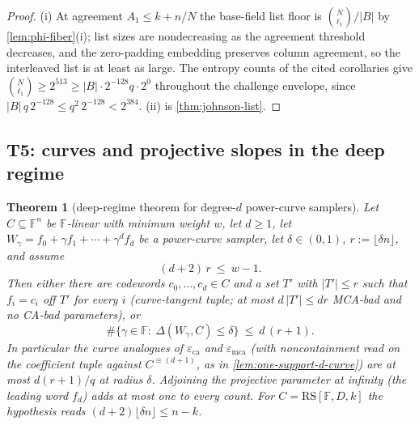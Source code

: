 \documentclass[11pt]{article}
\newtheorem{theorem}{Theorem}[section]
\theoremstyle{definition}
\theoremstyle{remark}
\newcommand{\F}{\mathbb{F}}
\newcommand{\B}{B}
\newcommand{\RS}{\mathrm{RS}}
\newcommand{\eca}{\varepsilon_{\mathrm{ca}}}
\newcommand{\emca}{\varepsilon_{\mathrm{mca}}}
\newcommand{\dist}{\Delta}
\begin{document}
\begin{proof}
(i) At agreement $A_1\le k+n/N$ the base-field list floor is $\binom N{\ell_1}/|\B|$ by \cref{lem:phi-fiber}\textup{(i)}; list sizes are nondecreasing as the agreement threshold decreases, and the zero-padding embedding preserves column agreement, so the interleaved list is at least as large. The entropy counts of the cited corollaries give $\binom N{\ell_1}\ge2^{513}\ge|\B|\cdot2^{-128}q\cdot2^{0}$ throughout the challenge envelope, since $|\B|\,q\,2^{-128}\le q^2\,2^{-128}<2^{384}$. (ii) is \cref{thm:johnson-list}.
\end{proof}

\subsection{T5: curves and projective slopes in the deep regime}\label{sec:discharge-T5}

\begin{theorem}[deep-regime theorem for degree-$d$ power-curve samplers]\label{thm:deep-curve}
Let $C\subseteq\F^n$ be $\F$-linear with minimum weight $w$, let $d\ge1$, let $W_\gamma=f_0+\gamma f_1+\cdots+\gamma^df_d$ be a power-curve sampler, let $\delta\in(0,1)$, $r:=\lfloor\delta n\rfloor$, and assume
\[
(d+2)\,r\ \le\ w-1 .
\]
Then either there are codewords $c_0,\dots,c_d\in C$ and a set $T'$ with $|T'|\le r$ such that $f_i=c_i$ off $T'$ for every $i$ \textup(curve-tangent tuple; at most $d\,|T'|\le dr$ MCA-bad and no CA-bad parameters\textup), or
\[
\#\{\gamma\in\F:\ \dist(W_\gamma,C)\le\delta\}\ \le\ d\,(r+1).
\]
In particular the curve analogues of $\eca$ and $\emca$ \textup(with noncontainment read on the coefficient tuple against $C^{\equiv(d+1)}$, as in \cref{lem:one-support-d-curve}\textup) are at most $d(r+1)/q$ at radius $\delta$. Adjoining the projective parameter at infinity \textup(the leading word $f_d$\textup) adds at most one to every count. For $C=\RS[\F,D,k]$ the hypothesis reads $(d+2)\lfloor\delta n\rfloor\le n-k$.
\end{theorem}
\end{document}
